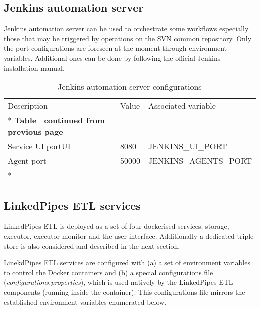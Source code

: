	\subsection{Jenkins automation server}
	
	Jenkins automation server can be used to orchestrate some workflows especially those that may be triggered by operations on the SVN common repository. Only the port configurations are foreseen at the moment through environment variables. Additional ones can be done by following the official Jenkins installation manual. 
	
	\begin{longtable}[c]{@{}p{4cm}p{5cm}l@{}}
		\toprule
		Description & Value & Associated variable \\* \midrule
		\endfirsthead
		\multicolumn{3}{c}%
		{{\bfseries Table \thetable\ continued from previous page}} \\
		\endhead
		Service UI portUI & 8080 & JENKINS\_UI\_PORT \\
		Agent port & 50000 & JENKINS\_AGENTS\_PORT \\* \bottomrule
		\caption{Jenkins automation server configurations}
		\label{tab:my-table4}\\
	\end{longtable}
	
	\subsection{LinkedPipes ETL services}
	
	LinkedPipes ETL is deployed as a set of four dockerised services: storage, executor, executor monitor and the user interface. Additionally a dedicated triple store is also considered and described in the next section. 
	
	LinekdPipes ETL services are configured with  (a) a set of environment variables to control the Docker containers and (b) a special configurations file (\textit{configurations.properties}), which is used natively by the LinkedPipes ETL components (running inside the container). This configurations file mirrors the  established environment variables enumerated below.

